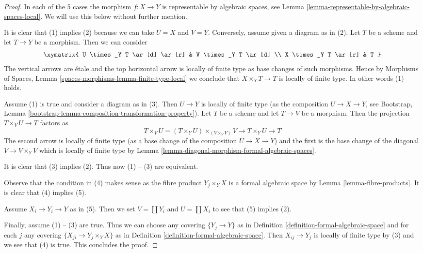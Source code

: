 \begin{proof}
In each of the 5 cases the morphism $f : X \to Y$ is representable
by algebraic spaces, see
Lemma \ref{lemma-representable-by-algebraic-spaces-local}.
We will use this below without further mention.

\medskip\noindent
It is clear that (1) implies (2) because we can take $U = X$ and $V = Y$.
Conversely, assume given a diagram as in (2). Let $T$ be a scheme and
let $T \to Y$ be a morphism. Then we can consider
$$
\xymatrix{
U \times_Y T \ar[d] \ar[r] & V \times_Y T \ar[d] \\
X \times_Y T \ar[r] & T
}
$$
The vertical arrows are \'etale and the top horizontal arrow
is locally of finite type as base changes of such morphisms.
Hence by Morphisms of Spaces, Lemma
\ref{spaces-morphisms-lemma-finite-type-local} we conclude that
$X \times_Y T \to T$ is locally of finite type. In other words
(1) holds.

\medskip\noindent
Assume (1) is true and consider a diagram as in (3).
Then $U \to Y$ is locally of finite type
(as the composition $U \to X \to Y$, see
Bootstrap, Lemma \ref{bootstrap-lemma-composition-transformation-property}).
Let $T$ be a scheme and let $T \to V$ be a morphism.
Then the projection $T \times_V U \to T$ factors as
$$
T \times_V U = (T \times_Y U) \times_{(V \times_Y V)} V
\to T \times_Y U \to T
$$
The second arrow is locally of finite type (as a base change
of the composition $U \to X \to Y$) and
the first is the base change of the diagonal $V \to V \times_Y V$
which is locally of finite type by
Lemma \ref{lemma-diagonal-morphism-formal-algebraic-spaces}.

\medskip\noindent
It is clear that (3) implies (2). Thus now (1) -- (3) are equivalent.

\medskip\noindent
Observe that the condition in (4) makes sense as the fibre product
$Y_j \times_Y X$ is a formal algebraic space by
Lemma \ref{lemma-fibre-products}.
It is clear that (4) implies (5).

\medskip\noindent
Assume $X_i \to Y_i \to Y$ as in (5). Then we set
$V = \coprod Y_i$ and $U = \coprod X_i$ to see that
(5) implies (2).

\medskip\noindent
Finally, assume (1) -- (3) are true.
Thus we can choose any covering $\{Y_j \to Y\}$ as in
Definition \ref{definition-formal-algebraic-space}
and for each $j$ any covering $\{X_{ji} \to Y_j \times_Y X\}$ as in
Definition \ref{definition-formal-algebraic-space}.
Then $X_{ij} \to Y_j$ is locally of finite type by (3)
and we see that (4) is true. This concludes the proof.
\end{proof}

